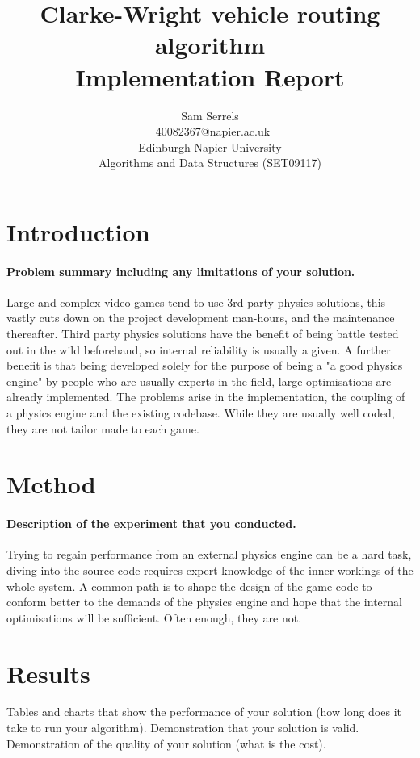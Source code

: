 \documentclass[conference]{acmsiggraph}
\title{Clarke-Wright vehicle routing algorithm\\
	   Implementation Report}
\author{Sam Serrels\\\ 40082367@napier.ac.uk \\
Edinburgh Napier University\\
Algorithms and Data Structures (SET09117)}
\begin{document}
\maketitle

\section{Introduction}


\cite{CW}
\cite{CWj}
\paragraph{Problem summary including any limitations of your solution.}
Large and complex video games tend to use 3rd party physics solutions, this vastly cuts down on the project development man-hours, and the maintenance thereafter. Third party physics solutions have the benefit of being battle tested out in the wild beforehand, so internal reliability is usually a given. A further benefit is that being developed solely for the purpose of being a "a good physics engine" by people who are usually experts in the field, large optimisations are already implemented. The problems arise in the implementation, the coupling of a physics engine and the existing codebase. While they are usually well coded, they are not tailor made to each game. 

\section{Method}
\paragraph{Description of the experiment that you conducted.}
Trying to regain performance from an external physics engine can be a hard task, diving into the source code requires expert knowledge of the inner-workings of the whole system. A common path is to shape the design of the game code to conform better to the demands of the physics engine and hope that the internal optimisations  will be sufficient. Often enough, they are not.

\section{Results}

Tables and charts that show the performance of your solution (how long does it take to run your algorithm).
Demonstration that your solution is valid.
Demonstration of the quality of your solution (what is the cost).
\end{document}
